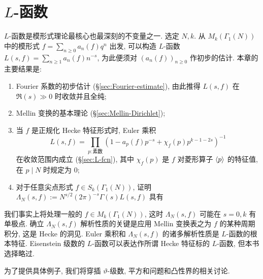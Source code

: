 
\chapter{\texorpdfstring{$L$}{L}-函数}
$L$-函数是模形式理论最核心也最深刻的不变量之一. 选定 $N, k$. 从 $M_k(\Gamma_1(N))$ 中的模形式 $f = \sum_{n \geq 0} a_n(f) q^n$ 出发, 可以构造 $L$-函数 $L(s,f) = \sum_{n \geq 1} a_n(f) n^{-s}$, 为此便须对 $(a_n(f))_{n \geq 0}$ 作初步的估计. 本章的主要结果是:
\begin{enumerate}
	\item Fourier 系数的初步估计 (\S\ref{sec:Fourier-estimate}), 由此推得 $L(s,f)$ 在 $\Re(s) \gg 0$ 时收敛并且全纯;
	\item Mellin 变换的基本理论 (\S\ref{sec:Mellin-Dirichlet});
	\item 当 $f$ 是正规化 Hecke 特征形式时, Euler 乘积
	\[ L(s,f) = \prod_{p: \text{素数}} \left( 1 - a_p(f) p^{-s} + \chi_f(p) p^{k-1-2s} \right)^{-1} \]
	在收敛范围内成立 (\S\ref{sec:L-fcn}), 其中 $\chi_f(p)$ 是 $f$ 对菱形算子 $\left\langle p \right\rangle$ 的特征值, 在 $p \mid N$ 时规定为 $0$;
	\item 对于任意尖点形式 $f \in S_k(\Gamma_1(N))$, 证明 $\Lambda_N(s,f) := N^{s/2} (2\pi)^{-s} \Gamma(s) L(s,f)$ 具有
\end{enumerate}

我们事实上将处理一般的 $f \in M_k(\Gamma_1(N))$, 这时 $\Lambda_N(s, f)$ 可能在 $s = 0, k$ 有单极点. 确立 $\Lambda_N(s,f)$ 解析性质的关键是应用 Mellin 变换表之为 $f$ 的某种周期积分, 这是 Hecke 的洞见. Euler 乘积和 $\Lambda_N(s,f)$ 的诸多解析性质是 $L$-函数的根本特征. Eisenstein 级数的 $L$-函数可以表达作所谓 Hecke 特征标的 $L$-函数, 但本书选择略过.

为了提供具体例子, 我们将穿插 $\vartheta$-级数, 平方和问题和凸性界的相关讨论.

